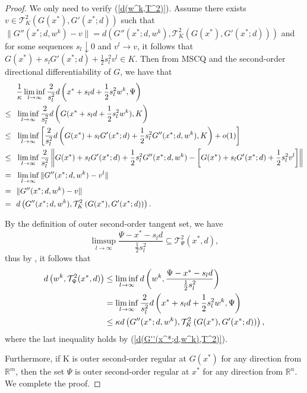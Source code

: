 \documentclass[11pt]{article}
\theoremstyle{definition}
\theoremstyle{remark}
\numberwithin{equation}{section}
\begin{document}
\begin{proof}
We only need to verify (\ref{d(w^k,T^2)}).
  Assume there exists $v\in \mathcal{T}_{K}^2\left(G(x^*),G'(x^*;d)\right)$ such that
 $\|G''(x^*;d,w^k)-v\|=d\left(G''(x^*;d,w^k),
  \mathcal{T}_{K}^2\left(G(x^*),G'(x^*;d)\right)\right)$ and for
some sequences $s_l\downarrow 0$ and $ v^l\to v$, it follows that
$G(x^*)+s_l G'(x^*;d)+\frac{1}{2}s_l^2v^l\in K$.
  Then from MSCQ and the second-order  directional differentiability of $G$, we have that
\begin{align}\label{d(G''(x^*;d,w^k),T^2)}
   &\frac{1}{\kappa}\liminf_{l\to \infty}\frac{2}{s_l^2}d\left(x^*+s_ld+\frac{1}{2}s_l^2w^k,\Psi\right)\notag\\
   \le~~ &\liminf_{l\to \infty}\frac{2}{s_l^2}d\left(G(x^*+s_ld+\frac{1}{2}s_l^2w^k),K\right)\notag\\
    \le~~ &\liminf_{l\to \infty}\left[\frac{2}{s_l^2}d\left(G(x^*)+s_lG'(x^*;d)+\frac{1}{2}s_l^2G''(x^*;d,w^k),K\right)+o(1) \right]\notag\\
   \le~~ &\liminf_{l\to \infty} \frac{2}{s_l^2}\left\|G(x^*)+s_lG'(x^*;d)+\frac{1}{2}s_l^2G''(x^*;d,w^k)
-\left[G(x^*)+s_lG'(x^*;d)+\frac{1}{2}s_l^2v^l\right]\right\| \notag\\
  = ~~ &\liminf_{l\to \infty}\|G''(x^*;d,w^k)-v^l\|\notag\\
  =~~ & \|G''(x^*;d,w^k)-v\|\notag\\
		=~~ & d\left(G''(x^*;d,w^k),
		\mathcal{T}_{K}^2\left(G(x^*),G'(x^*;d)\right)\right).
\end{align}


By the definition of outer second-order tangent set, we have
 $$\limsup_{l\to \infty}\frac{\Psi-x^*-s_ld}{\frac{1}{2}s_l^2}\subseteq\mathcal{T}^2_{\Psi}(x^*,d),$$
 thus by \cite[Corollary 4.7]{Rockafellar}, it follows that
 \begin{align}%
  d\left(w^k,\mathcal{T}^2_{\Psi}(x^*,d)\right)&\le \liminf_{l\to
  \infty}d\left(w^k,\frac{\Psi-x^*-s_ld}{\frac{1}{2}s_l^2}\right)\notag\\
  &= \liminf_{l\to \infty}\frac{2}{s_l^2}d\left(x^*+s_ld+\frac{1}{2}s_l^2w^k,\Psi\right)\notag\\
  &\le \kappa d\left(G''(x^*;d,w^k), \mathcal{T}_{K}^2\left(G(x^*),G'(x^*;d)\right)\right),\notag
 \end{align}
 where the last inequality holds by (\ref{d(G''(x^*;d,w^k),T^2)}).

  Furthermore,
  if K is outer second-order regular at $G(x^*)$ for any direction from $\mathbb{R}^m$, then the set $\Psi$ is
  outer second-order regular at $x^*$ for any direction from $\mathbb{R}^n$.
 We complete the proof.
\end{proof}
\end{document}
